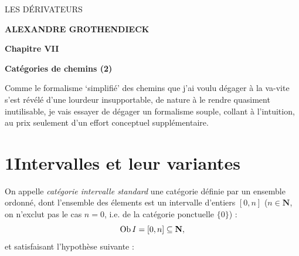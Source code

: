 \dgrchunkbegin

\printedpage{}

\begin{center}
{\Large\textsf{LES DÉRIVATEURS}}

\bigskip

\textbf{ALEXANDRE GROTHENDIECK}

\bigskip\bigskip

\textbf{Chapitre VII}

\medskip

\textbf{Catégories de chemins (2)}
\end{center}

\newpage

\printedpage{}


\newpage


Comme le formalisme ‘simplifié’ des chemins que j'ai voulu dégager à la va-vite s'est révélé d'une lourdeur insupportable, de nature à le rendre quasiment inutilisable, je vais essayer de dégager un formalisme souple, collant à l'intuition, au prix seulement d'un effort conceptuel supplémentaire.

\section*{1\quad Intervalles et leur variantes} %

On appelle \textit{catégorie intervalle standard} une catégorie définie par un ensemble ordonné, dont l'ensemble des élements est un intervalle d'entiers $[0,n]$ ($n\in\mathbf{N}$, on n'exclut pas le cas $n=0$, i.e. de la catégorie ponctuelle $\{0\}$) : %
\[
\operatorname{Ob} I=[0,n]\subseteq\mathbf{N},
\]
et satisfaisant l'hypothèse suivante :

